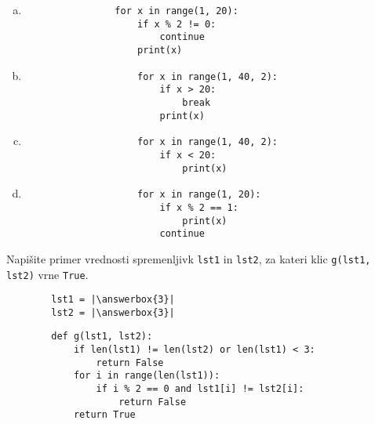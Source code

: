 \documentclass[arhiv, 10pt]{../izpit}
\newcommand{\inlinepy}[1]{\texttt{#1}}
\newcommand{\answerbox}[1]{\framebox{\vphantom{\large M}\hspace{#1cm}}}
\begin{document}
        \begin{multicols}{2}
        \begin{enumerate}[(a)]
\item 
            \begin{verbatim}
                for x in range(1, 20):
                    if x % 2 != 0:
                        continue
                    print(x)
            \end{verbatim}
        
\item 
                \begin{verbatim}
                    for x in range(1, 40, 2):
                        if x > 20:
                            break
                        print(x)
                \end{verbatim}
            
\item 
                \begin{verbatim}
                    for x in range(1, 40, 2):
                        if x < 20:
                            print(x)
                \end{verbatim}
            
\item 
                \begin{verbatim}
                    for x in range(1, 20):
                        if x % 2 == 1:
                            print(x)
                        continue
                \end{verbatim}
            
\end{enumerate}

        \end{multicols}
    
        \naloga*
        \begin{multicols}{2}
        \noindent
        Napišite primer vrednosti spremenljivk \inlinepy{lst1} in \inlinepy{lst2}, za kateri klic \inlinepy{g(lst1, lst2)} vrne \inlinepy{True}.
        \begin{verbatim}
        lst1 = |\answerbox{3}|
        lst2 = |\answerbox{3}|
        \end{verbatim}
        \vfil
        \columnbreak
        \begin{verbatim}
        def g(lst1, lst2):
            if len(lst1) != len(lst2) or len(lst1) < 3:
                return False
            for i in range(len(lst1)):
                if i % 2 == 0 and lst1[i] != lst2[i]:
                    return False
            return True
        \end{verbatim}
        \end{multicols}
    
\end{document}
